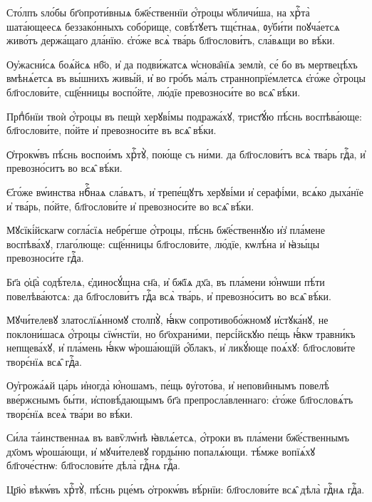 \hKv Сто́лпъ ѕло́бы бг҃опроти́вныѧ  бж҃е́ственнїи ѻ҆́троцы ѡ҆бличи́ша, на хрⷭ҇та̀ шата́ющеесѧ  беззако́нныхъ собо́рище, совѣ́тꙋетъ тщє́тнаѧ, ᲂу҆би́ти  поꙋча́етсѧ живо́тъ держа́щаго дла́нїю. є҆го́же всѧ̀ тва́рь  бл҃гослови́тъ, сла́вѧщи во вѣ́ки. 
%

\hKv Оу҆жасни́сѧ боѧ́йсѧ нб҃о, и҆ да  подви́жатсѧ ѡ҆снова̑нїѧ землѝ, се́ бо въ мертвецѣ́хъ  вмѣнѧ́етсѧ въ вы́шнихъ живы́й, и҆ во гро́бъ ма́лъ  страннопрїе́млетсѧ є҆го́же ѻ҆́троцы бл҃гослови́те,  сщ҃е́нницы воспо́йте, лю́дїе превозноси́те во всѧ̑ вѣ́ки. 
%

\hKv Прпⷣбнїи твоѝ ѻ҆́троцы въ пещѝ херꙋві́мы подража́хꙋ,  трист҃ꙋ́ю пѣ́снь воспѣва́юще: бл҃гослови́те, по́йте и҆  превозноси́те въ всѧ̑ вѣ́ки.  

\hKv Ѻ҆трокѡ́въ пѣ́снь воспои́мъ хрⷭ҇тꙋ̀, пою́ще съ ни́ми. да  бл҃гослови́тъ всѧ̀ тва́рь гдⷭ҇а, и҆ превозно́ситъ во всѧ̑  вѣ́ки. 

\hKv Є҆го́же вѡ́инства нбⷭ҇наѧ сла́вѧтъ, и҆ трепе́щꙋтъ херꙋві́ми  и҆ серафі́ми, всѧ́ко дыха́нїе и҆ тва́рь, по́йте,  бл҃гослови́те и҆ превозноси́те во всѧ̑ вѣ́ки. 

\hKv Мꙋсїкі́йскагѡ согла́сїѧ небре́гше ѻ҆́троцы, пѣ́снь  бж҃е́ственнꙋю и҆з̾ пла́мене воспѣва́хꙋ, глаго́люще:  сщ҃е́нницы бл҃гослови́те, лю́дїе, кѡлѣ́на и҆ ꙗ҆зы́цы  превозноси́те гдⷭ҇а. 

\hKv Бг҃а ѻ҆ц҃а̀ содѣ́телѧ, є҆диносꙋ́щна сн҃а, и҆ бж҃їѧ дх҃а,  въ пла́мени ю҆́нѡши пѣ́ти повелѣва́ютсѧ: да бл҃гослови́тъ  гдⷭ҇а всѧ̀ тва́рь, и҆ превозно́ситъ во всѧ̑ вѣ́ки. 

\hKv Мꙋчи́телевꙋ златослїѧ́нномꙋ столпꙋ̀, ꙗ҆́кѡ  сопротивобо́жномꙋ и҆стꙋка́нꙋ, не поклони́шасѧ ѻ҆́троцы  сїѡ́нстїи, но бг҃охрани́ми, персі́йскꙋю пе́щь ꙗ҆́кѡ  травни́къ непщева́хꙋ, и҆ пла́мень ꙗ҆́кѡ ѡ҆роша́ющїй  ѻ҆́блакъ, и҆  ликꙋ́юще поѧ́хꙋ:  бл҃гослови́те творє́нїѧ всѧ̑ гдⷭ҇а. 

\hKv Оу҆грожа́ѧй ца́рь и҆ногда̀ ю҆́ношамъ, пе́щь ᲂу҆гото́ва, и҆  непови̑ннымъ повелѣ̀ вве́ржєнымъ бы́ти, и҆сповѣ́дающымъ  бг҃а препросла́вленнаго: є҆го́же бл҃гословѧ́тъ творє́нїѧ  всеѧ̀ тва́ри во вѣ́ки. 

\hKv Си́ла та́инственнаѧ въ вавѷлѡ́нѣ ꙗ҆влѧ́етсѧ, ѻ҆́троки въ  пла́мени бж҃е́ственнымъ дх҃омъ ѡ҆роша́ющи, и҆ мꙋчи́телевꙋ  горды́ню попалѧ́ющи. тѣ́мже вопїѧ́хꙋ бл҃гоче́стнѡ:  бл҃гослови́те дѣла̀ гдⷭ҇нѧ гдⷭ҇а. 

\hKv Цр҃ю̀ вѣкѡ́въ хрⷭ҇тꙋ̀, пѣ́снь рце́мъ ѻ҆трокѡ́въ вѣ́рнїи:  бл҃гослови́те всѧ̑ дѣла̀ гдⷭ҇нѧ гдⷭ҇а. 

